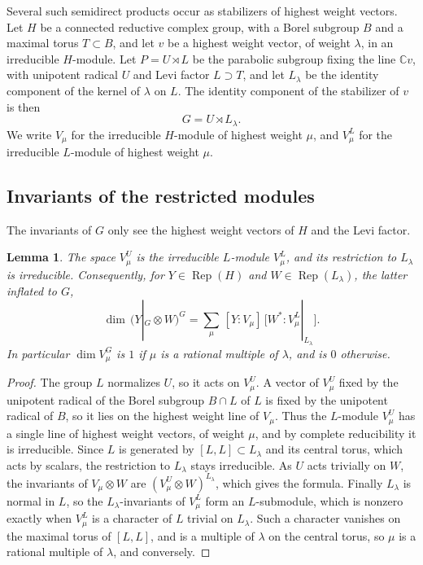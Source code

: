 \documentclass[11pt,reqno]{amsart}
\newtheorem{lemma}[theorem]{Lemma}
\theoremstyle{definition}
\newcommand{\Rep}{\operatorname{Rep}}
\begin{document}
Several such semidirect products occur as stabilizers of highest weight vectors. Let $H$ be a connected reductive complex group, with a Borel subgroup $B$ and a maximal torus $T\subset B$, and let $v$ be a highest weight vector, of weight $\lambda$, in an irreducible $H$-module. Let $P=U\rtimes L$ be the parabolic subgroup fixing the line $\mathbb Cv$, with unipotent radical $U$ and Levi factor $L\supset T$, and let $L_\lambda$ be the identity component of the kernel of $\lambda$ on $L$. The identity component of the stabilizer of $v$ is then
\[
   G=U\rtimes L_\lambda .
\]
We write $V_\mu$ for the irreducible $H$-module of highest weight $\mu$, and $V^L_\mu$ for the irreducible $L$-module of highest weight $\mu$.

\subsection{Invariants of the restricted modules}
The invariants of $G$ only see the highest weight vectors of $H$ and the Levi factor.

\begin{lemma}\label{lem:levi}
The space $V_\mu^U$ is the irreducible $L$-module $V^L_\mu$, and its restriction to $L_\lambda$ is irreducible. Consequently, for $Y\in\Rep(H)$ and $W\in\Rep(L_\lambda)$, the latter inflated to $G$,
\[
   \dim\,(Y|_G\otimes W)^G=\sum_\mu\,[Y:V_\mu]\,\bigl[W^*:V^L_\mu|_{L_\lambda}\bigr] .
\]
In particular $\dim V_\mu^G$ is $1$ if $\mu$ is a rational multiple of $\lambda$, and is $0$ otherwise.
\end{lemma}

\begin{proof}
The group $L$ normalizes $U$, so it acts on $V_\mu^U$. A vector of $V_\mu^U$ fixed by the unipotent radical of the Borel subgroup $B\cap L$ of $L$ is fixed by the unipotent radical of $B$, so it lies on the highest weight line of $V_\mu$. Thus the $L$-module $V_\mu^U$ has a single line of highest weight vectors, of weight $\mu$, and by complete reducibility it is irreducible. Since $L$ is generated by $[L,L]\subset L_\lambda$ and its central torus, which acts by scalars, the restriction to $L_\lambda$ stays irreducible. As $U$ acts trivially on $W$, the invariants of $V_\mu\otimes W$ are $(V_\mu^U\otimes W)^{L_\lambda}$, which gives the formula. Finally $L_\lambda$ is normal in $L$, so the $L_\lambda$-invariants of $V^L_\mu$ form an $L$-submodule, which is nonzero exactly when $V^L_\mu$ is a character of $L$ trivial on $L_\lambda$. Such a character vanishes on the maximal torus of $[L,L]$, and is a multiple of $\lambda$ on the central torus, so $\mu$ is a rational multiple of $\lambda$, and conversely.
\end{proof}
\end{document}
